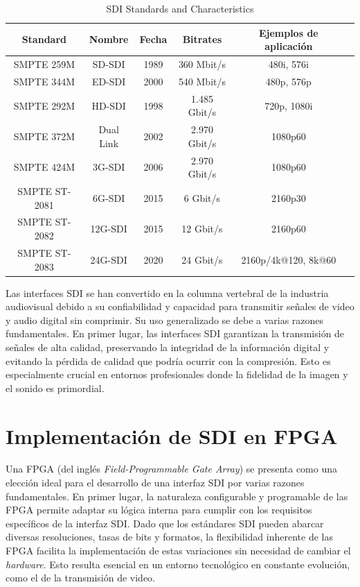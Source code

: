 \begin{table}[h]
    \centering
    \begin{tabular}{cccccc}
        \toprule
        \textbf{Standard} & \textbf{Nombre} & \textbf{Fecha} & \textbf{Bitrates} & \textbf{Ejemplos de aplicación} \\
        \midrule
        SMPTE 259M      & SD-SDI    & 1989 & 360 Mbit/s     & 480i, 576i \\
        SMPTE 344M      & ED-SDI    & 2000 & 540 Mbit/s     & 480p, 576p \\
        SMPTE 292M      & HD-SDI    & 1998 & 1.485 Gbit/s   & 720p, 1080i \\
        SMPTE 372M      & Dual Link & 2002 & 2.970 Gbit/s   & 1080p60 \\
        SMPTE 424M      & 3G-SDI    & 2006 & 2.970 Gbit/s   & 1080p60 \\
        SMPTE ST-2081   & 6G-SDI    & 2015 & 6 Gbit/s       & 2160p30 \\
        SMPTE ST-2082   & 12G-SDI   & 2015 & 12 Gbit/s      & 2160p60 \\
        SMPTE ST-2083   & 24G-SDI   & 2020 & 24 Gbit/s      & 2160p/4k@120, 8k@60 \\
        \bottomrule
    \end{tabular}
    \caption{SDI Standards and Characteristics}
    \label{tab:sdi_standards}
\end{table}

Las interfaces SDI se han convertido en la columna vertebral de la industria
audiovisual debido a su confiabilidad y capacidad para transmitir señales de
video y audio digital sin comprimir. Su uso generalizado se debe a varias
razones fundamentales. En primer lugar, las interfaces SDI garantizan la
transmisión de señales de alta calidad, preservando la integridad de la
información digital y evitando la pérdida de calidad que podría ocurrir con la
compresión. Esto es especialmente crucial en entornos profesionales donde la
fidelidad de la imagen y el sonido es primordial.

\section{Implementación de SDI en FPGA}

Una FPGA (del inglés \textit{Field-Programmable Gate Array}) se presenta como
una elección ideal para el desarrollo de una interfaz SDI por varias razones
fundamentales. En primer lugar, la naturaleza configurable y programable de las
FPGA permite adaptar su lógica interna para cumplir con los requisitos
específicos de la interfaz SDI. Dado que los estándares SDI pueden abarcar
diversas resoluciones, tasas de bits y formatos, la flexibilidad inherente de
las FPGA facilita la implementación de estas variaciones sin necesidad de
cambiar el \textit{hardware}. Esto resulta esencial en un entorno tecnológico
en constante evolución, como el de la transmisión de video.

